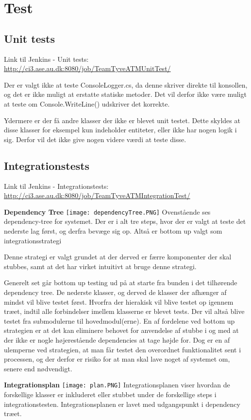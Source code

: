 \graphicspath{{Billeder/}}
\chapter{Test}
\section{Unit tests}
Link til Jenkins - Unit tests: \url{http://ci3.ase.au.dk:8080/job/TeamTyveATMUnitTest/} \newline 

Der er valgt ikke at teste ConsoleLogger.cs, da denne skriver direkte til konsollen, og det er ikke muligt at erstatte statiske metoder. Det vil derfor ikke være muligt at teste om Console.WriteLine() udskriver det korrekte. 

Ydermere er der få andre klasser der ikke er blevet unit testet. Dette skyldes at disse klasser for eksempel kun indeholder entiteter, eller ikke har nogen logik i sig. Derfor vil det ikke give nogen videre værdi at teste disse.

\section{Integrationstests}
Link til Jenkins - Integrationstests: \url{http://ci3.ase.au.dk:8080/job/TeamTyveATMIntegrationTest/} \newline

\textbf{Dependency Tree} \newline
\texttt{[image: dependencyTree.PNG]} \newline
Ovenstående ses dependency-tree for systemet. Der er i alt tre steps, hvor der er valgt at teste det nederste lag først, og derfra bevæge sig op. Altså er bottom up valgt som integrationsstrategi \newline

Denne strategi er valgt grundet at der derved er færre komponenter der skal stubbes, samt at det har virket intuitivt at bruge denne strategi.

Generelt set går bottom up testing ud på at starte fra bunden i det tilhørende dependency tree. De nederste klasser, og derved de klasser der afhænger af mindst vil blive testet først. Hvorfra der hierakisk vil blive testet op igennem træet, indtil alle forbindelser imellem klasserne er blevet tests. Der vil altså blive testet fra submodulerne til hovedmodul(erne).
En af fordelene ved bottom up strategien er at det kan eliminere behovet for anvendelse af stubbe i og med at der ikke er nogle højerestående dependencies at tage højde for. Dog er en af ulemperne ved strategien, at man får testet den overordnet funktionalitet sent i processen, og der derfor er risiko for at man skal lave noget af systemet om, senere end nødvendigt. \newline

\textbf{Integrationsplan} \newline
\texttt{[image: plan.PNG]} \newline
Integrationsplanen viser hvordan de forskellige klasser er inkluderet eller stubbet under de forskellige steps i integrationstesten. Integrationsplanen er lavet med udgangspunkt i dependency træet.


